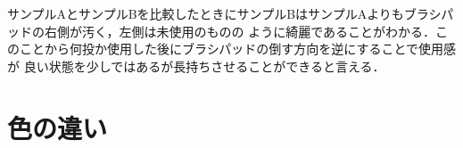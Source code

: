 \documentclass[main]{subfiles}
\begin{document}
サンプルAとサンプルBを比較したときにサンプルBはサンプルAよりもブラシパッドの右側が汚く，左側は未使用のものの
ように綺麗であることがわかる．このことから何投か使用した後にブラシパッドの倒す方向を逆にすることで使用感が
良い状態を少しではあるが長持ちさせることができると言える．
\\

\section{色の違い}
\end{document}
